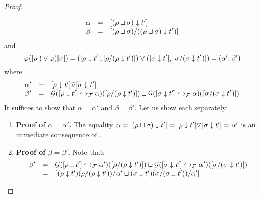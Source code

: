 \begin{proof}
\begin{enumerate}
\begin{enumerate}
\begin{enumerate}
\[        \begin{array}{rcl}
        \alpha & = & {[(\rho \sqcup \sigma) \downarrow t']} \\
        \beta  & = & {[(\rho \sqcup \sigma) / ((\rho \sqcup \sigma) \downarrow t')]} \\
        \end{array}
      \]
      and
      \[
        \varphi({[\rho]}) \lor \varphi({[\sigma]})
        = ({[\rho \downarrow t']}, {[\rho / (\rho \downarrow t')]}) \lor
          ({[\sigma \downarrow t']}, {[\sigma / (\sigma \downarrow t')]}) \\
        = (\alpha', \beta') \\
      \]
      where
      \[
        \begin{array}{rcl}
        \alpha' & = & {[\rho \downarrow t']} \triangledown {[\sigma\downarrow t']} \\
        \beta'  & = &
               \mathcal{G}({[\rho \downarrow t']} \hookrightarrow_{\mathcal{F}} \alpha)({[\rho / (\rho \downarrow t')]}) \sqcup \mathcal{G}({[\sigma \downarrow t']} \hookrightarrow_{\mathcal{F}} \alpha)({[\sigma / (\sigma \downarrow t')]})
        \end{array}
      \]
      It suffices to show that $\alpha = \alpha'$ and $\beta = \beta'$.
      Let us show each separately:
      \begin{enumerate}
      \item {\bf Proof of $\alpha = \alpha'$.}
        The equality
        $
          \alpha
          = {[(\rho \sqcup \sigma) \downarrow t']}
          = {[\rho \downarrow t']} \triangledown {[\sigma\downarrow t']}
          = \alpha'
        $
        is an immediate consequence of .
      \item {\bf Proof of $\beta = \beta'$.}
        Note that:
        \[
          \begin{array}{rcll}
          \beta'
                & = & \mathcal{G}({[\rho \downarrow t']} \hookrightarrow_{\mathcal{F}} \alpha')({[\rho / (\rho \downarrow t')]}) \sqcup
                      \mathcal{G}({[\sigma \downarrow t']} \hookrightarrow_{\mathcal{F}} \alpha')({[\sigma / (\sigma \downarrow t')]}) \\
                & = &
                     {[
                       (\rho \downarrow t')(\rho / (\rho \downarrow t'))/\alpha'
                       \sqcup
                       (\sigma \downarrow t')(\sigma / (\sigma \downarrow t'))/\alpha'
                     ]} \\

\end{array}\]
\end{enumerate}
\end{enumerate}
\end{enumerate}
\end{enumerate}
\end{proof}
